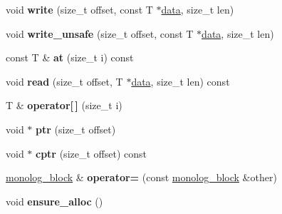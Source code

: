 \begin{DoxyCompactItemize}
void {\bfseries write} (size\+\_\+t offset, const T $\ast$\hyperlink{structdialog_1_1data}{data}, size\+\_\+t len)
\item 
\mbox{\label{classdialog_1_1monolog_1_1monolog__block_ac4697bb76d9e298c3444c174c51a0f76}} 
void {\bfseries write\+\_\+unsafe} (size\+\_\+t offset, const T $\ast$\hyperlink{structdialog_1_1data}{data}, size\+\_\+t len)
\item 
\mbox{\label{classdialog_1_1monolog_1_1monolog__block_afd735c98a1a3b35a0c0edefa29698163}} 
const T \& {\bfseries at} (size\+\_\+t i) const
\item 
\mbox{\label{classdialog_1_1monolog_1_1monolog__block_af811bad52de9b8eb6727c85ed6c7a0f9}} 
void {\bfseries read} (size\+\_\+t offset, T $\ast$\hyperlink{structdialog_1_1data}{data}, size\+\_\+t len) const
\item 
\mbox{\label{classdialog_1_1monolog_1_1monolog__block_ac751c5945c87da1418c2bb166208e5a2}} 
T \& {\bfseries operator\mbox{[}$\,$\mbox{]}} (size\+\_\+t i)
\item 
\mbox{\label{classdialog_1_1monolog_1_1monolog__block_aff3e78fd6dc26862fc2f5417afc083dd}} 
void $\ast$ {\bfseries ptr} (size\+\_\+t offset)
\item 
\mbox{\label{classdialog_1_1monolog_1_1monolog__block_a23eeab6885d2f01fa5fbd4f37580791f}} 
void $\ast$ {\bfseries cptr} (size\+\_\+t offset) const
\item 
\mbox{\label{classdialog_1_1monolog_1_1monolog__block_ac34214b6ff292835f96b19eca0163a0a}} 
\hyperlink{classdialog_1_1monolog_1_1monolog__block}{monolog\+\_\+block} \& {\bfseries operator=} (const \hyperlink{classdialog_1_1monolog_1_1monolog__block}{monolog\+\_\+block} \&other)
\item 
\mbox{\label{classdialog_1_1monolog_1_1monolog__block_ab414dafa816d5170c8ab3c4ace387b23}} 
void {\bfseries ensure\+\_\+alloc} ()
\end{DoxyCompactItemize}
